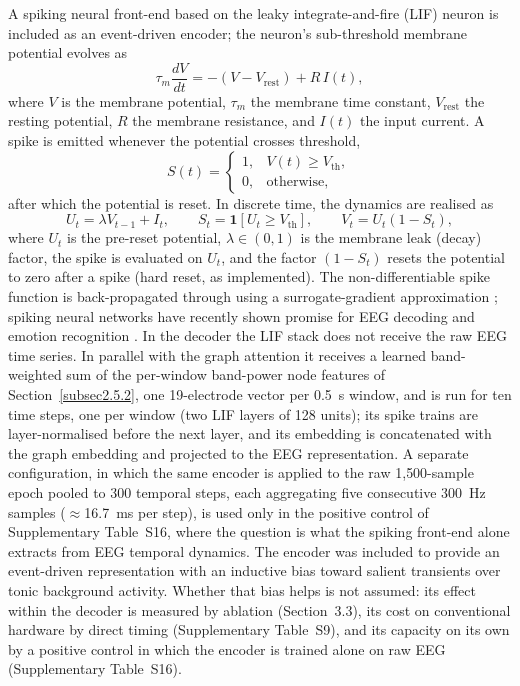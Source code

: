 \documentclass[pdflatex,sn-basic,Numbered]{sn-jnl}
\begin{document}
A spiking neural front-end based on the leaky integrate-and-fire (LIF) neuron \cite{ref38} is included as an event-driven encoder; the neuron's sub-threshold membrane potential evolves as
\begin{equation}
\tau_m \frac{dV}{dt} = -(V - V_{\text{rest}}) + R\,I(t), \label{eq6}
\end{equation}
where $V$ is the membrane potential, $\tau_m$ the membrane time constant, $V_{\text{rest}}$ the resting potential, $R$ the membrane resistance, and $I(t)$ the input current. A spike is emitted whenever the potential crosses threshold,
\begin{equation}
S(t) = \begin{cases} 1, & V(t) \geq V_{\text{th}}, \\ 0, & \text{otherwise}, \end{cases} \label{eq7}
\end{equation}
after which the potential is reset. In discrete time, the dynamics are realised as
\begin{equation}
U_t = \lambda V_{t-1} + I_t, \qquad S_t = \mathbf{1}\!\left[U_t \geq V_{\mathrm{th}}\right], \qquad V_t = U_t\left(1 - S_t\right), \label{eq8}
\end{equation}
where $U_t$ is the pre-reset potential, $\lambda \in (0,1)$ is the membrane leak (decay) factor, the spike is evaluated on $U_t$, and the factor $(1-S_t)$ resets the potential to zero after a spike (hard reset, as implemented). The non-differentiable spike function is back-propagated through using a surrogate-gradient approximation \cite{ref39}; spiking neural networks have recently shown promise for EEG decoding and emotion recognition \cite{ref40,ref41,ref42}. In the decoder the LIF stack does not receive the raw EEG time series. In parallel with the graph attention it receives a learned band-weighted sum of the per-window band-power node features of Section~\ref{subsec2.5.2}, one 19-electrode vector per 0.5~s window, and is run for ten time steps, one per window (two LIF layers of 128 units); its spike trains are layer-normalised before the next layer, and its embedding is concatenated with the graph embedding and projected to the EEG representation. A separate configuration, in which the same encoder is applied to the raw 1{,}500-sample epoch pooled to 300 temporal steps, each aggregating five consecutive 300~Hz samples ($\approx$16.7~ms per step), is used only in the positive control of Supplementary Table~S16, where the question is what the spiking front-end alone extracts from EEG temporal dynamics. The encoder was included to provide an event-driven representation with an inductive bias toward salient transients over tonic background activity. Whether that bias helps is not assumed: its effect within the decoder is measured by ablation (Section~3.3), its cost on conventional hardware by direct timing (Supplementary Table~S9), and its capacity on its own by a positive control in which the encoder is trained alone on raw EEG (Supplementary Table~S16).
\end{document}
